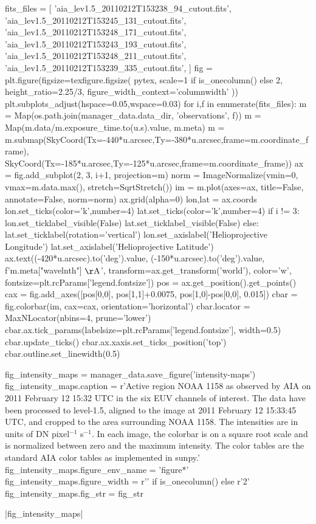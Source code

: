 \begin{pycode}
fits_files = [
    'aia_lev1.5_20110212T153238_94_cutout.fits',
    'aia_lev1.5_20110212T153245_131_cutout.fits',
    'aia_lev1.5_20110212T153248_171_cutout.fits',
    'aia_lev1.5_20110212T153243_193_cutout.fits',
    'aia_lev1.5_20110212T153248_211_cutout.fits',
    'aia_lev1.5_20110212T153239_335_cutout.fits',
]
fig = plt.figure(figsize=texfigure.figsize(
    pytex,
    scale=1 if is_onecolumn() else 2,
    height_ratio=2.25/3,
    figure_width_context='columnwidth'
))
plt.subplots_adjust(hspace=0.05,wspace=0.03)
for i,f in enumerate(fits_files):
    m = Map(os.path.join(manager_data.data_dir, 'observations', f))
    m = Map(m.data/m.exposure_time.to(u.s).value, m.meta)
    m = m.submap(SkyCoord(Tx=-440*u.arcsec,Ty=-380*u.arcsec,frame=m.coordinate_frame),
                 SkyCoord(Tx=-185*u.arcsec,Ty=-125*u.arcsec,frame=m.coordinate_frame))
    ax = fig.add_subplot(2, 3, i+1, projection=m)
    norm = ImageNormalize(vmin=0, vmax=m.data.max(), stretch=SqrtStretch())
    im = m.plot(axes=ax, title=False, annotate=False, norm=norm)
    ax.grid(alpha=0)
    lon,lat = ax.coords
    lon.set_ticks(color='k',number=4)
    lat.set_ticks(color='k',number=4)
    if i != 3:
        lon.set_ticklabel_visible(False)
        lat.set_ticklabel_visible(False)
    else:
        lat.set_ticklabel(rotation='vertical')
        lon.set_axislabel('Helioprojective Longitude')
        lat.set_axislabel('Helioprojective Latitude')
    ax.text((-420*u.arcsec).to('deg').value,
            (-150*u.arcsec).to('deg').value,
            f'{m.meta["wavelnth"]} $\mathrm{{\AA}}$',
            transform=ax.get_transform('world'),
            color='w',
            fontsize=plt.rcParams['legend.fontsize'])
    pos = ax.get_position().get_points()
    cax = fig.add_axes([pos[0,0], pos[1,1]+0.0075, pos[1,0]-pos[0,0], 0.015])
    cbar = fig.colorbar(im, cax=cax, orientation='horizontal')
    cbar.locator = MaxNLocator(nbins=4, prune='lower')
    cbar.ax.tick_params(labelsize=plt.rcParams['legend.fontsize'], width=0.5)
    cbar.update_ticks()
    cbar.ax.xaxis.set_ticks_position('top')
    cbar.outline.set_linewidth(0.5)

fig_intensity_maps = manager_data.save_figure('intensity-maps')
fig_intensity_maps.caption = r'Active region NOAA 1158 as observed by AIA on 2011 February 12 15:32 UTC in the six EUV channels of interest. The data have been processed to level-1.5, aligned to the image at 2011 February 12 15:33:45 UTC, and cropped to the area surrounding NOAA 1158. The intensities are in units of DN pixel$^{-1}$ s$^{-1}$. In each image, the colorbar is on a square root scale and is normalized between zero and the maximum intensity. The color tables are the standard AIA color tables as implemented in sunpy.'
fig_intensity_maps.figure_env_name = 'figure*'
fig_intensity_maps.figure_width = r'\columnwidth' if is_onecolumn() else r'2\columnwidth'
fig_intensity_maps.fig_str = fig_str
\end{pycode}
|fig_intensity_maps|

